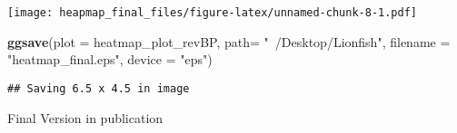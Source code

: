 \documentclass[]{article}
\newenvironment{Shaded}{\begin{snugshade}}{\end{snugshade}}
\newcommand{\KeywordTok}[1]{\textcolor[rgb]{0.13,0.29,0.53}{\textbf{#1}}}
\newcommand{\DataTypeTok}[1]{\textcolor[rgb]{0.13,0.29,0.53}{#1}}
\newcommand{\StringTok}[1]{\textcolor[rgb]{0.31,0.60,0.02}{#1}}
\newcommand{\NormalTok}[1]{#1}
\begin{document}
\texttt{[image: heapmap\_final\_files/figure-latex/unnamed-chunk-8-1.pdf]}

\begin{Shaded}
\begin{Highlighting}[]
\KeywordTok{ggsave}\NormalTok{(}\DataTypeTok{plot =}\NormalTok{ heatmap_plot_revBP, }\DataTypeTok{path=} \StringTok{"~/Desktop/Lionfish"}\NormalTok{, }\DataTypeTok{filename =} \StringTok{"heatmap_final.eps"}\NormalTok{, }\DataTypeTok{device =} \StringTok{"eps"}\NormalTok{)}
\end{Highlighting}
\end{Shaded}

\begin{verbatim}
## Saving 6.5 x 4.5 in image
\end{verbatim}

Final Version in publication
\end{document}
